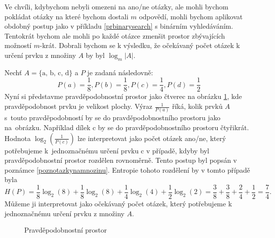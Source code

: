 \begin{prikl}[m odpovědí]\label{prmodpovedi}
    Ve chvíli, kdybychom nebyli omezeni na ano/ne otázky, ale mohli bychom pokládat otázky na které bychom dostali $m$ odpovědí, mohli bychom aplikovat obdobný postup jako v příkladu \ref{prbinarysearch} s binárním vyhledáváním. Tentokrát bychom ale mohli po každé otázce zmenšit prostor zbývajících možností $m$-krát. Dobrali bychom se k výsledku, že očekávaný počet otázek k určení prvku z množiny $A$ by byl $\log_m |A|$.
\end{prikl}

\begin{prikl}\label{prentropierozdeleni}
Nechť $A = \{ \text{a, b, c, d}\}$ a $P$ je zadaná následovně: 
\[P(a) = \frac{1}{8}, P(b) = \frac{1}{8}, P(c) = \frac{1}{4}, P(d) = \frac{1}{2}\]
Nyní si představme pravděpodobnostní prostor jako čtverec na obrázku \ref{prprostor}, kde pravděpodobnost prvku je velikost plochy. Výraz $\frac{1}{P(a)}$ říká, kolik prvků $A$ s~touto pravděpodobností by se  do pravděpodobnostního prostoru jako na~obrázku. Například dílek c by se  do pravděpodobnostního prostoru čtyřikrát.
Hodnota $\log_2\left(\frac{1}{P(c)}\right)$ lze interpretovat jako počet otázek ano/ne, který potřebujeme k~jednoznačnému určení prvku c v případě, kdyby byl pravděpodobnostní prostor rozdělen rovnoměrně. Tento postup byl popsán 
v poznámce \ref{poznotazkynamnozinu}.
Entropie tohoto rozdělení by v tomto případě byla 
\[H(P) = \frac{1}{8}\log_2 (8) + \frac{1}{8}\log_2 (8) + \frac{1}{4}\log_2 (4) + \frac{1}{2}\log_2 (2) = \frac{3}{8} + \frac{3}{8} + \frac{2}{4} + \frac{1}{2} = \frac{7}{4}.\]
Můžeme ji interpretovat jako očekávaný počet otázek, který potřebujeme k jednoznačnému určení prvku z množiny $A$. 


\begin{figure}
\caption{Pravděpodobnostní prostor}
\label{prprostor}
\end{figure}

\end{prikl}

